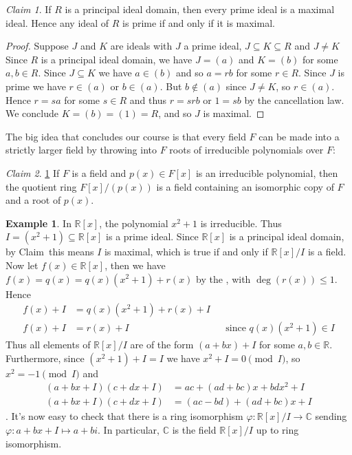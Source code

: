 \documentclass[12pt,letterpaper,DIV=11,final]{scrartcl}
\theoremstyle{plain}
\theoremstyle{definition}
\newtheorem{example}{Example}[section]
\theoremstyle{remark}
\newtheorem{claim}{Claim}
\begin{document}
\begin{claim}
  If $R$ is a principal ideal domain, then every prime ideal is a maximal ideal.
  Hence any ideal of $R$ is prime if and only if it is maximal.

  \begin{proof}
    Suppose $J$ and $K$ are ideals with $J$ a prime ideal, $J \subseteq K \subseteq R$ and $J \neq K$
    Since $R$ is a principal ideal domain, we have $J = (a)$ and $K = (b)$ for some $a, b \in R$.
    Since $J \subseteq K$ we have $a \in (b)$ and so $a = rb$ for some $r \in R$.
    Since $J$ is prime we have $r \in (a)$ or $b \in (a)$.
    But $b \not\in (a)$ since $J \neq K$, so $r \in (a)$.
    Hence $r = sa$ for some $s \in R$ and thus $r = srb$ or $1 = sb$ by the cancellation law.
    We conclude $K = (b) = (1) = R$, and so $J$ is maximal.
  \end{proof}
\end{claim}

The big idea that concludes our course is that every field $F$ can be made into a strictly larger field by throwing into $F$ roots of irreducible polynomials over $F$:

\begin{claim}\ref{claim:poly_isomorphic}
  If $F$ is a field and $p(x) \in F[x]$ is an irreducible polynomial, then the quotient ring $F[x]/ \left( p(x) \right)$ is a field containing an isomorphic copy of $F$ and a root of $p(x)$.
\end{claim}

\begin{example}
  In $\mathbb{R}[x]$, the polynomial $x^2 + 1$ is irreducible.
  Thus $I = \left( x^2 + 1 \right) \subseteq \mathbb{R}[x]$ is a prime ideal.
  Since $\mathbb{R}[x]$ is a principal ideal domain, by Claim~\label{claim:poly_isomorphic} this means $I$ is maximal, which is true if and only if $\mathbb{R}[x]/I$ is a field.
  Now let $f(x) \in \mathbb{R}[x]$, then we have $f(x) = q(x) = q(x) (x^2 + 1) + r(x)$ by the , with $\deg(r(x)) \leq 1$.
  Hence
  \begin{align*}
    f(x) + I &= q(x) (x^2 + 1) + r(x) + I \\
    f(x) + I &= r(x) + I && \text{since $q(x) (x^2 + 1) \in I$}
  \end{align*}
  Thus all elements of $\mathbb{R}[x]/I$ are of the form $(a + bx) + I$ for some $a, b \in \mathbb{R}$.
  Furthermore, since $(x^2 + 1) + I = I$ we have $x^2 + I = 0 \pmod{I}$, so $x^2 = -1 \pmod{I}$ and
  \begin{align*}
    (a + bx + I) (c + dx + I) &= ac + (ad + bc) x + bdx^2 + I \\
    (a + bx + I) (c + dx + I) &= (ac - bd) + (ad + bc) x + I
  \end{align*}.
  It's now easy to check that there is a ring isomorphism $\varphi : \mathbb{R}[x]/I \to \mathbb{C}$ sending $\varphi : a + bx + I \mapsto a + bi$.
  In particular, $\mathbb{C}$ is the field $\mathbb{R}[x]/I$ up to ring isomorphism.

\end{example}


  
\end{document}
